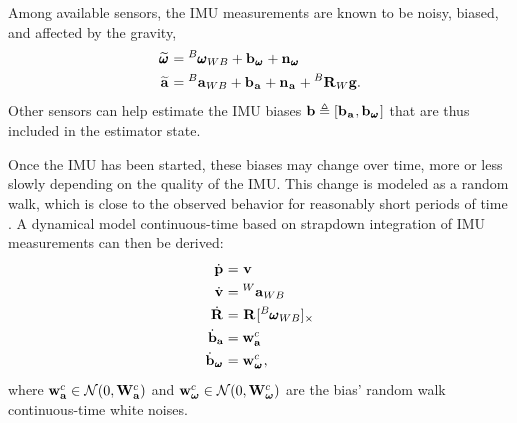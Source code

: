 Among available sensors, the IMU measurements are known to be noisy, biased, and affected by the gravity,
%
\begin{equation}
    \begin{split}
    \prescript{}{}{\widetilde{\pmb{\omega}}}_{} &= \prescript{B}{}{\pmb{\omega}}_{WB} + {\bf b}_{\prescript{}{}{\pmb{\omega}}_{}} + {\bf n}_{\prescript{}{}{\pmb{\omega}}_{}} 
    \\
    \prescript{}{}{\widetilde{{\bf a}}}_{}    &= \prescript{B}{}{{\bf a}}_{WB} + {\bf b}_{\prescript{}{}{{\bf a}}_{}} + {\bf n}_{\prescript{}{}{{\bf a}}_{}} + \prescript{B}{}{{\bf R}}_{W} {\bf g} .
    \end{split}
    \label{eq:imu_meas_model}
\end{equation}
%    
Other sensors can help estimate the IMU biases ${\bf b} \triangleq [{\bf b}_{\prescript{}{}{{\bf a}}_{}}, {\bf b}_{\prescript{}{}{\pmb{\omega}}_{}}]$ that are thus included in the estimator state.


Once the IMU has been started, these biases may change over time, more or less slowly depending on the quality of the IMU. This change is modeled 
as a random walk, which is close to the observed behavior for reasonably short periods of time \cite{hussen2015low}.
A dynamical model continuous-time based on strapdown integration of IMU measurements can then be derived:
%
\begin{align}
\begin{split}
    \dot{\prescript{}{}{{\bf p}}_{}} &= \prescript{}{}{{\bf v}}_{} \\
    \dot{\prescript{}{}{{\bf v}}_{}} &= \prescript{W}{}{{\bf a}}_{WB} \\
    \dot{\prescript{}{}{{\bf R}}_{}} &= \prescript{}{}{{\bf R}}_{} [\prescript{B}{}{\pmb{\omega}}_{WB}]_{\times} \\
    \dot{{\bf b}}_{{\bf a}} &= {\bf w}_{{\bf a}}^c \\
    \dot{{\bf b}}_{\prescript{}{}{\pmb{\omega}}_{}} &= {\bf w}_{\prescript{}{}{\pmb{\omega}}_{}}^c ,
\end{split}
\label{eq:imu_dyn_conti}
\end{align}
%
where ${\bf w}_{{\bf a}}^c \in \mathcal{N}(0,{\bf W}_{\bf a}^c)$ and ${\bf w}_{{{\bm \omega}}}^c \in \mathcal{N}(0,{\bf W}_{{\bm \omega}}^c)$ are the bias' random walk continuous-time white noises.

